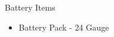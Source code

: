 \begin{battery}{Battery Items}
    \begin{itemize}
        \item Battery Pack - 24 Gauge
    \end{itemize}
\end{battery}
